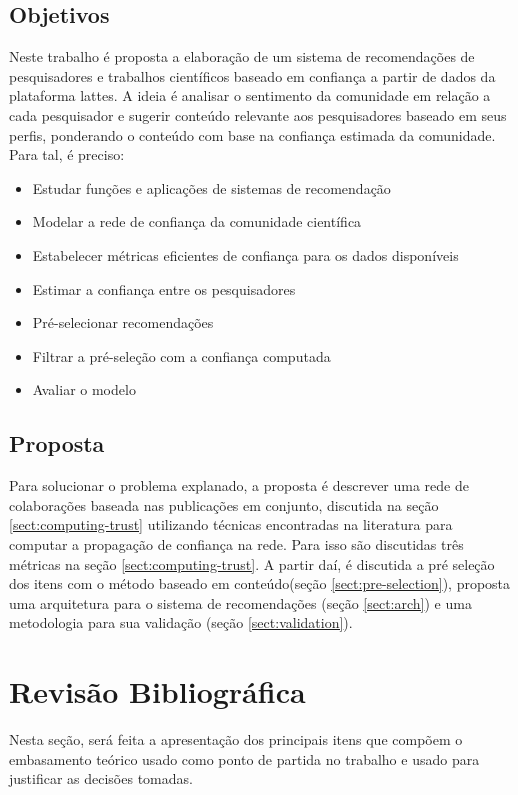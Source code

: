 \documentclass[12pt]{article}
\begin{document}
\subsection{Objetivos}

Neste trabalho é proposta a elaboração de um sistema de recomendações de pesquisadores e trabalhos científicos baseado 
em confiança a partir de dados da plataforma lattes. A ideia é analisar o sentimento da comunidade em relação a cada
pesquisador e sugerir conteúdo relevante aos pesquisadores baseado em seus perfis, ponderando o conteúdo com base na 
confiança estimada da comunidade. Para tal, é preciso:

\begin{itemize}
  \item Estudar funções e aplicações de sistemas de recomendação
  \item Modelar a rede de confiança da comunidade científica
  \item Estabelecer métricas eficientes de confiança para os dados disponíveis
  \item Estimar a confiança entre os pesquisadores 
  \item Pré-selecionar recomendações
  \item Filtrar a pré-seleção com a confiança computada
  \item Avaliar o modelo
\end{itemize}

\subsection{Proposta}

Para solucionar o problema explanado, a proposta é descrever uma rede de colaborações baseada nas publicações em conjunto, 
discutida na seção \ref{sect:computing-trust} utilizando técnicas encontradas na literatura para computar a propagação de 
confiança na rede. Para isso são discutidas três métricas na seção \ref{sect:computing-trust}. A partir daí, é discutida a 
pré seleção dos itens com o método baseado em conteúdo(seção \ref{sect:pre-selection}), proposta uma arquitetura para o sistema 
de recomendações (seção \ref{sect:arch}) e uma metodologia para sua validação (seção \ref{sect:validation}).

\section{Revisão Bibliográfica}

Nesta seção, será feita a apresentação dos principais itens que compõem o  embasamento teórico usado como ponto de 
partida no trabalho e usado para justificar as decisões tomadas.
\end{document}
